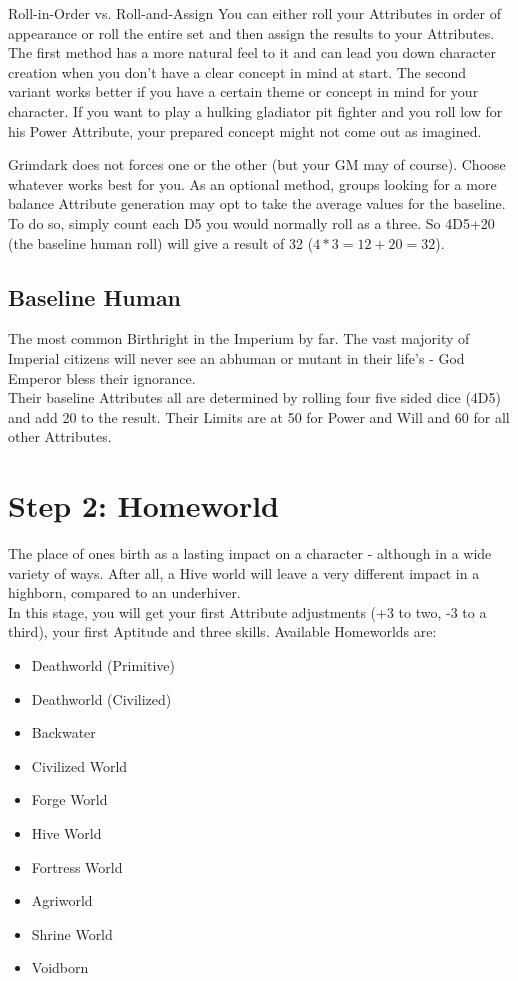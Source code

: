 \begin{DndSidebar}{Roll-in-Order vs. Roll-and-Assign}
You can either roll your Attributes in order of appearance or roll the entire set and then assign the results to your Attributes.
The first method has a more natural feel to it and can lead you down character creation when you don't have a clear concept in mind at start. The second variant works better if you have a certain theme or concept in mind for your character. If you want to play a hulking gladiator pit fighter and you roll low for his Power Attribute, your prepared concept might not come out as imagined.

Grimdark does not forces one or the other (but your GM may of course). Choose whatever works best for you.
As an optional method, groups looking for a more balance Attribute generation may opt to take the average values for the baseline. To do so, simply count each D5 you would normally roll as a three. So 4D5+20 (the baseline human roll) will give a result of 32 ($4*3=12 + 20 = 32$).
\end{DndSidebar}

\subsection{Baseline Human}
The most common Birthright in the Imperium by far. The vast majority of Imperial citizens will never see an abhuman or mutant in their life's - God Emperor bless their ignorance.\\
Their baseline Attributes all are determined by rolling four five sided dice (4D5) and add 20 to the result.
Their Limits are at 50 for Power and Will and 60 for all other Attributes.

\section{Step 2: Homeworld} %
\label{sec:lifepath_2_Homeworld}
The place of ones birth as a lasting impact on a character - although in a wide variety of ways. After all, a Hive world will leave a very different impact in a highborn, compared to an underhiver.\\
In this stage, you will get your first Attribute adjustments (+3 to two, -3 to a third), your first Aptitude and three skills.
Available Homeworlds are:
\begin{itemize}
	\item Deathworld (Primitive)
	\item Deathworld (Civilized)
	\item Backwater
	\item Civilized World
	\item Forge World
	\item Hive World
	\item Fortress World
	\item Agriworld
	\item Shrine World
	\item Voidborn
\end{itemize}



